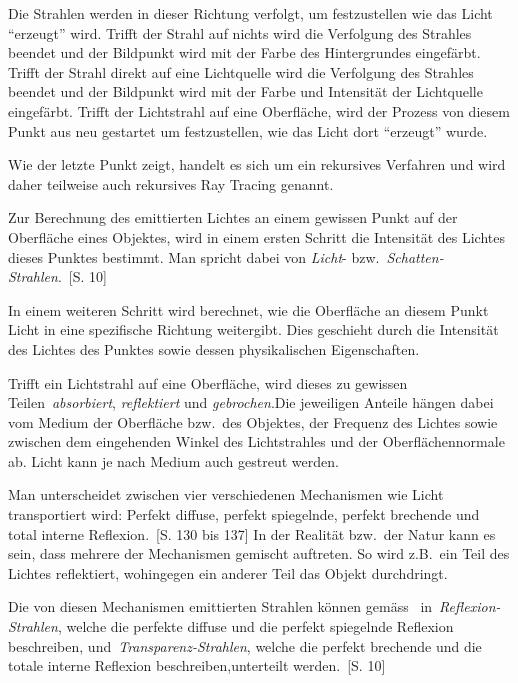 Die Strahlen werden in dieser Richtung verfolgt, um festzustellen wie
das Licht ``erzeugt'' wird. Trifft der Strahl auf nichts wird die
Verfolgung des Strahles beendet und der Bildpunkt wird mit der Farbe des
Hintergrundes eingefärbt. Trifft der Strahl direkt auf eine Lichtquelle
wird die Verfolgung des Strahles beendet und der Bildpunkt wird mit der
Farbe und Intensität der Lichtquelle eingefärbt.  Trifft der Lichtstrahl
auf eine Oberfläche, wird der Prozess von diesem Punkt aus neu gestartet
um festzustellen, wie das Licht dort ``erzeugt'' wurde. 

Wie der letzte Punkt zeigt, handelt es sich um ein rekursives Verfahren
und wird daher teilweise auch rekursives Ray Tracing genannt.

Zur Berechnung des emittierten Lichtes an einem gewissen Punkt auf der
Oberfläche eines Objektes, wird in einem ersten Schritt die Intensität
des Lichtes dieses Punktes bestimmt. Man spricht dabei von \textit{Licht}- bzw.\
\textit{Schatten-Strahlen}.~\cite{glassner_introduction_1989}[S. 10]

In einem weiteren Schritt wird berechnet, wie die Oberfläche an
diesem Punkt Licht in eine spezifische Richtung weitergibt. Dies
geschieht durch die Intensität des Lichtes des Punktes sowie dessen
physikalischen Eigenschaften.

Trifft ein Lichtstrahl auf eine Oberfläche, wird dieses zu gewissen
Teilen~\textit{absorbiert}, \textit{reflektiert} und
\textit{gebrochen}.Die jeweiligen Anteile hängen dabei vom Medium der
Oberfläche bzw.\ des Objektes, der Frequenz des Lichtes sowie zwischen
dem eingehenden Winkel des Lichtstrahles und der Oberflächennormale ab.
Licht kann je nach Medium auch gestreut werden.

Man unterscheidet zwischen vier verschiedenen Mechanismen wie Licht
transportiert wird: Perfekt diffuse, perfekt spiegelnde, perfekt
brechende und total interne
Reflexion.~\cite{glassner_introduction_1989}[S. 130 bis 137]
In der Realität bzw.\ der Natur kann es sein, dass mehrere der
Mechanismen gemischt auftreten. So wird z.B.\ ein Teil des Lichtes
reflektiert, wohingegen ein anderer Teil das Objekt durchdringt.

Die von diesen Mechanismen emittierten Strahlen können
gemäss~\citeauthor{glassner_introduction_1989}
in~\textit{Reflexion-Strahlen}, welche die perfekte diffuse und die
perfekt spiegelnde Reflexion beschreiben,
und~\textit{Transparenz-Strahlen}, welche die perfekt brechende und die
totale interne Reflexion beschreiben,unterteilt
werden.~\cite{glassner_introduction_1989}[S. 10]

